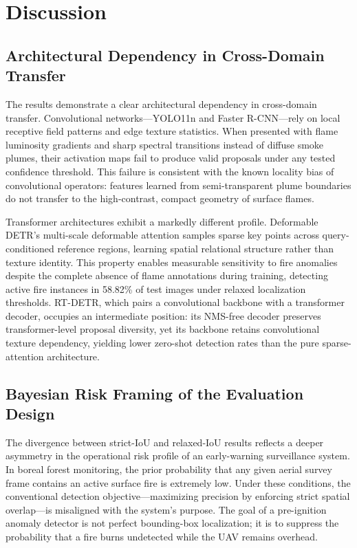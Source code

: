 \documentclass[conference]{IEEEtran}
\begin{document}
\section{Discussion}

\subsection{Architectural Dependency in Cross-Domain Transfer}
The results demonstrate a clear architectural dependency in cross-domain transfer. Convolutional networks---YOLO11n and Faster R-CNN---rely on local receptive field patterns and edge texture statistics. When presented with flame luminosity gradients and sharp spectral transitions instead of diffuse smoke plumes, their activation maps fail to produce valid proposals under any tested confidence threshold. This failure is consistent with the known locality bias of convolutional operators: features learned from semi-transparent plume boundaries do not transfer to the high-contrast, compact geometry of surface flames.

Transformer architectures exhibit a markedly different profile. Deformable DETR's multi-scale deformable attention samples sparse key points across query-conditioned reference regions, learning spatial relational structure rather than texture identity. This property enables measurable sensitivity to fire anomalies despite the complete absence of flame annotations during training, detecting active fire instances in 58.82\% of test images under relaxed localization thresholds. RT-DETR, which pairs a convolutional backbone with a transformer decoder, occupies an intermediate position: its NMS-free decoder preserves transformer-level proposal diversity, yet its backbone retains convolutional texture dependency, yielding lower zero-shot detection rates than the pure sparse-attention architecture.

\subsection{Bayesian Risk Framing of the Evaluation Design}
The divergence between strict-IoU and relaxed-IoU results reflects a deeper asymmetry in the operational risk profile of an early-warning surveillance system. In boreal forest monitoring, the prior probability that any given aerial survey frame contains an active surface fire is extremely low. Under these conditions, the conventional detection objective---maximizing precision by enforcing strict spatial overlap---is misaligned with the system's purpose. The goal of a pre-ignition anomaly detector is not perfect bounding-box localization; it is to suppress the probability that a fire burns undetected while the UAV remains overhead.
\end{document}
